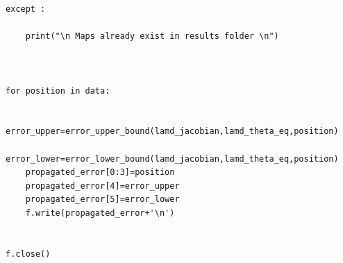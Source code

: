{\begin{itemize}
\begin{verbatim}
except :

    print("\n Maps already exist in results folder \n")



for position in data:
    
    error_upper=error_upper_bound(lamd_jacobian,lamd_theta_eq,position)
    error_lower=error_lower_bound(lamd_jacobian,lamd_theta_eq,position)
    propagated_error[0:3]=position
    propagated_error[4]=error_upper
    propagated_error[5]=error_lower
    f.write(propagated_error+'\n')
    
    
f.close()
    
    

    

        
    
    
    
    
    \end{verbatim}    
            
            
        \end{itemize}
    }
    
    

